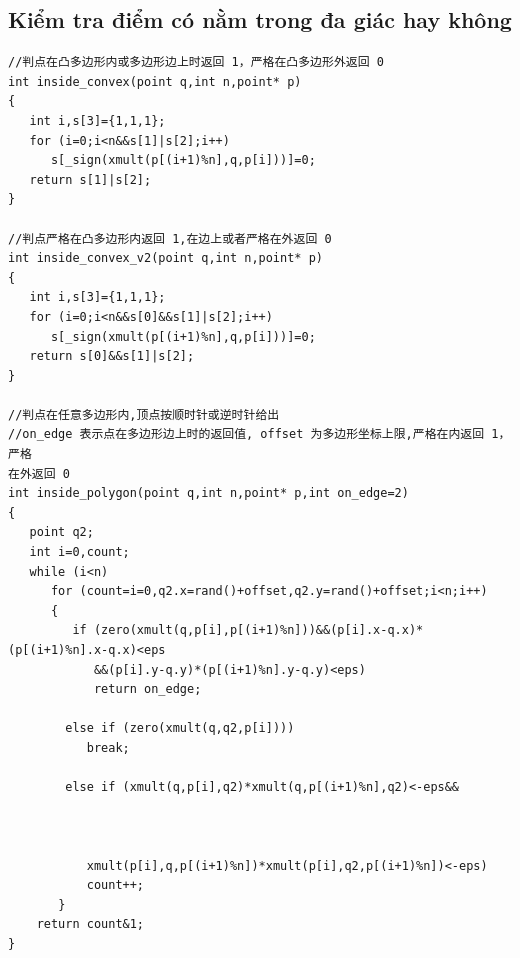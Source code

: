 \documentclass[11pt]{article}
\begin{document}
\subsection{Kiểm tra điểm có nằm trong đa giác hay không}
\begingroup
\scriptsize
\begin{verbatim}
//判点在凸多边形内或多边形边上时返回 1，严格在凸多边形外返回 0
int inside_convex(point q,int n,point* p)
{
   int i,s[3]={1,1,1};
   for (i=0;i<n&&s[1]|s[2];i++)
      s[_sign(xmult(p[(i+1)%n],q,p[i]))]=0;
   return s[1]|s[2];
}

//判点严格在凸多边形内返回 1,在边上或者严格在外返回 0
int inside_convex_v2(point q,int n,point* p)
{
   int i,s[3]={1,1,1};
   for (i=0;i<n&&s[0]&&s[1]|s[2];i++)
      s[_sign(xmult(p[(i+1)%n],q,p[i]))]=0;
   return s[0]&&s[1]|s[2];
}

//判点在任意多边形内,顶点按顺时针或逆时针给出
//on_edge 表示点在多边形边上时的返回值, offset 为多边形坐标上限,严格在内返回 1，严格
在外返回 0
int inside_polygon(point q,int n,point* p,int on_edge=2)
{
   point q2;
   int i=0,count;
   while (i<n)
      for (count=i=0,q2.x=rand()+offset,q2.y=rand()+offset;i<n;i++)
      {
         if (zero(xmult(q,p[i],p[(i+1)%n]))&&(p[i].x-q.x)*(p[(i+1)%n].x-q.x)<eps
            &&(p[i].y-q.y)*(p[(i+1)%n].y-q.y)<eps)
            return on_edge;

        else if (zero(xmult(q,q2,p[i])))
           break;

        else if (xmult(q,p[i],q2)*xmult(q,p[(i+1)%n],q2)<-eps&&



           xmult(p[i],q,p[(i+1)%n])*xmult(p[i],q2,p[(i+1)%n])<-eps)
           count++;
       }
    return count&1;
}




\end{verbatim}
\endgroup
\end{document}
